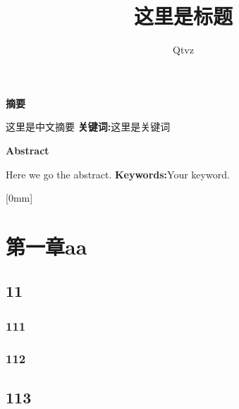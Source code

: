 \documentclass{ctexart}%
\title{这里是标题}
\author{Qtvz}
\date{}%
\newcommand{\xiaosihao}{\fontsize{12pt}{\baselineskip}\selectfont}  %
\newcommand{\upcite}[1]{\textsuperscript{\textsuperscript{\cite{#1}}}}
\begin{document}
	\maketitle
	\thispagestyle{plain}
	\setcounter{page}{1}%
	\thispagestyle{plain}
	\begin{center}	
		\LARGE{\textbf{摘要}}	
	\end{center}
	\begin{adjustwidth}{1cm}{1cm}
		\large
		\hspace{2em}这里是中文摘要
		\newline
		\textbf{关键词:}这里是关键词
	\end{adjustwidth}
	\newpage
	\thispagestyle{plain}
	\begin{center}	
		\LARGE{\textbf{Abstract}}	
	\end{center}
	\begin{adjustwidth}{1cm}{1cm}
		\large
		\hspace{1.8em}Here we go the abstract.
		\newline
		\textbf{Keywords:}Your keyword.
	\end{adjustwidth}
	\thispagestyle{plain}
	\newpage
	\tableofcontents
	[0mm]
	{\bf \large}%
	{\contentslabel{2.5em}}%
	{}%
	{\titlerule*[0.5pc]{$\cdot$}\contentspage\hspace*{-0.3mm}}%
	\thispagestyle{fancy}
	\newpage
	\thispagestyle{fancy}
	\setcounter{page}{1}
	\section*{第一章\quad aa}
	\setcounter{section}{1}
	\setcounter{figure}{1}
	\setcounter{table}{1}
	\subsection{11}
	\subsubsection{111}
	\xiaosihao
	112121\upcite{Qtvz's,11,la}\par
	\subsubsection{112}
	\subsection{113}
	\newpage
\end{document}

